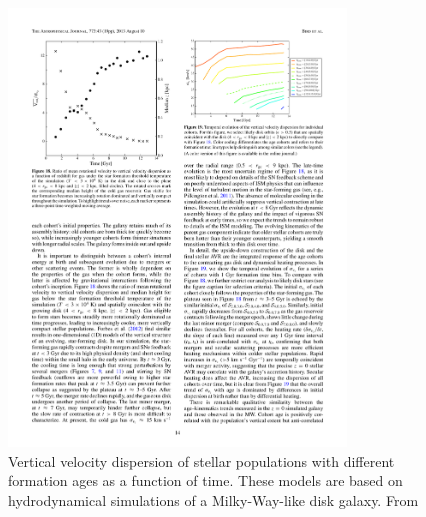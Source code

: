 \begin{figure}
  \centering
  \includegraphics[width=0.8\textwidth]{Introduction/figs/bird_13.pdf}
  \caption[Dynamical setteling in a Milky-Way-like galaxy
  model]{\fixspacing\label{intro:fig:bird}Vertical velocity dispersion
    of stellar populations with different formation ages as a function
    of time. These models are based on hydrodynamical simulations of a
    Milky-Way-like disk galaxy. From \citet{Bird13}}
\end{figure}

